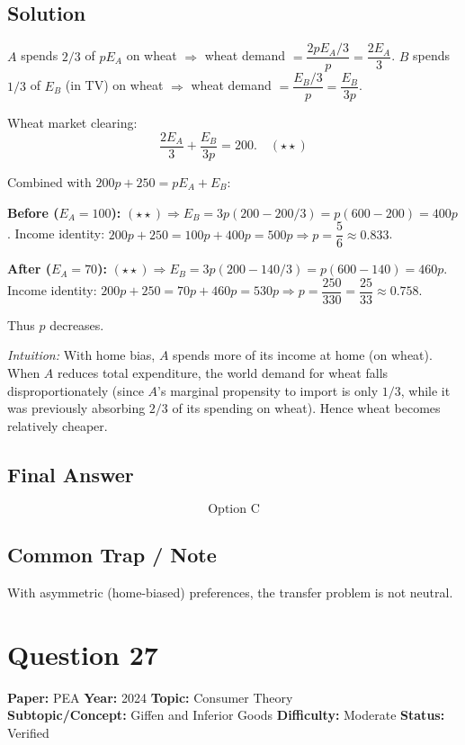 \documentclass[11pt]{article}
\begin{document}
\subsection*{Solution}
$A$ spends $2/3$ of $pE_A$ on wheat $\Rightarrow$ wheat demand $=\dfrac{2pE_A/3}{p}=\dfrac{2E_A}{3}$. $B$ spends $1/3$ of $E_B$ (in TV) on wheat $\Rightarrow$ wheat demand $=\dfrac{E_B/3}{p}=\dfrac{E_B}{3p}$.

Wheat market clearing:
\[
\frac{2E_A}{3}+\frac{E_B}{3p}=200. \quad (\star\star)
\]

Combined with $200p+250=pE_A+E_B$:

\textbf{Before ($E_A=100$):} $(\star\star)\Rightarrow E_B=3p(200-200/3)=p(600-200)=400p$. Income identity: $200p+250=100p+400p=500p\Rightarrow p=\dfrac{5}{6}\approx 0.833$.

\textbf{After ($E_A=70$):} $(\star\star)\Rightarrow E_B=3p(200-140/3)=p(600-140)=460p$. Income identity: $200p+250=70p+460p=530p\Rightarrow p=\dfrac{250}{330}=\dfrac{25}{33}\approx 0.758$.

Thus $p$ decreases.

\textit{Intuition:} With home bias, $A$ spends more of its income at home (on wheat). When $A$ reduces total expenditure, the world demand for wheat falls disproportionately (since $A$'s marginal propensity to import is only $1/3$, while it was previously absorbing $2/3$ of its spending on wheat). Hence wheat becomes relatively cheaper.

\subsection*{Final Answer}
\[
\boxed{\text{Option C}}
\]

\subsection*{Common Trap / Note}
With asymmetric (home-biased) preferences, the transfer problem is not neutral.

\section*{Question 27}
\textbf{Paper:} PEA \quad \textbf{Year:} 2024 \quad \textbf{Topic:} Consumer Theory \\
\textbf{Subtopic/Concept:} Giffen and Inferior Goods \quad \textbf{Difficulty:} Moderate \quad \textbf{Status:} Verified
\end{document}
